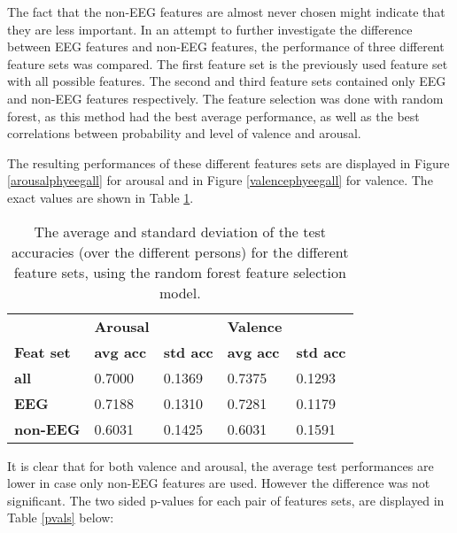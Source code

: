 The fact that the non-EEG features are almost never chosen might indicate that they are less important. In an attempt to further investigate the difference between EEG features and non-EEG features, the performance of three different feature sets was compared. The first feature set is the previously used feature set with all possible features. The second and third feature sets contained only EEG and non-EEG features respectively. The feature selection was done with random forest, as this method had the best average performance, as well as the best correlations between probability and level of valence and arousal. 

\npar

The resulting performances of these different features sets are displayed in Figure \ref{arousalphyeegall} for arousal and in Figure \ref{valencephyeegall} for valence. The exact values are shown in Table \ref{phyeegalltable}.



\begin{table}[H]
\centering
\begin{tabular}{l|ll|ll}
         & \textbf{Arousal} &         & \textbf{Valence} &         \\
\textbf{Feat set} & \textbf{avg acc} & \textbf{std acc} & \textbf{avg acc} & \textbf{std acc} \\ \hline 
\textbf{all}      & 0.7000  & 0.1369  & 0.7375  & 0.1293  \\
\textbf{EEG}      & 0.7188  & 0.1310  & 0.7281  & 0.1179  \\
\textbf{non-EEG}  & 0.6031  & 0.1425  & 0.6031  & 0.1591 
\end{tabular}
\caption{The average and standard deviation of the test accuracies (over the different persons) for the different feature sets, using the random forest feature selection model.\label{phyeegalltable}}
\end{table}

It is clear that for both valence and arousal, the average test performances are lower in case only non-EEG features are used. However the difference was not significant. The two sided p-values for each pair of features sets, are displayed in Table \ref{pvals} below:

